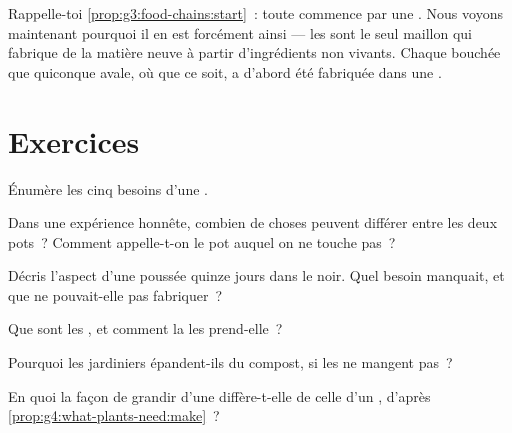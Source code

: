 \begin{remark}\label{rem:g4:what-plants-need:everyone}
Rappelle-toi \cref{prop:g3:food-chains:start}~: toute  commence par une . Nous voyons maintenant pourquoi
il en est forcément ainsi --- les  sont le seul maillon qui
fabrique de la matière neuve à partir d'ingrédients non vivants.
Chaque bouchée que quiconque avale, où que ce soit, a d'abord été
fabriquée dans une .
\end{remark}

\section{Exercices}

\begin{exercise}[$\star$]\label{exo:g4:what-plants-need:1}
Énumère les cinq besoins d'une .
\end{exercise}

\begin{exercise}[$\star$]\label{exo:g4:what-plants-need:2}
Dans une expérience honnête, combien de choses peuvent différer
entre les deux pots~? Comment appelle-t-on le pot auquel on ne
touche pas~?
\end{exercise}

\begin{exercise}[$\star$]\label{exo:g4:what-plants-need:3}
Décris l'aspect d'une  poussée quinze jours dans le noir. Quel
besoin manquait, et que ne pouvait-elle pas fabriquer~?
\end{exercise}

\begin{exercise}[$\star$]\label{exo:g4:what-plants-need:4}
Que sont les , et comment la  les prend-elle~?
\end{exercise}

\begin{exercise}[$\star$]\label{exo:g4:what-plants-need:5}
Pourquoi les jardiniers épandent-ils du compost, si les  ne
mangent pas~?
\end{exercise}

\begin{exercise}[$\star$]\label{exo:g4:what-plants-need:6}
En quoi la façon de grandir d'une  diffère-t-elle de celle
d'un , d'après \cref{prop:g4:what-plants-need:make}~?
\end{exercise}

